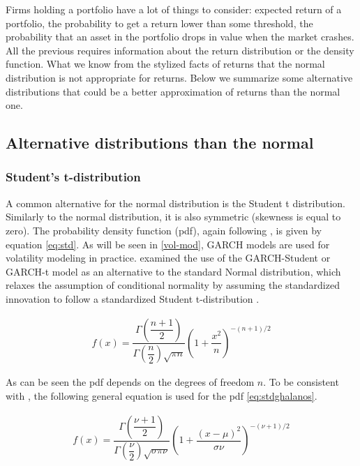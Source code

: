 \documentclass[a4paper, twoside]{templates/ociamthesis}
\begin{document}
\noindent Firms holding a portfolio have a lot of things to consider: expected return of a portfolio, the probability to get a return lower than some threshold, the probability that an asset in the portfolio drops in value when the market crashes. All the previous requires information about the return distribution or the density function. What we know from the stylized facts of returns that the normal distribution is not appropriate for returns. Below we summarize some alternative distributions that could be a better approximation of returns than the normal one.

\hypertarget{conditional-distributions}{%
\subsection{Alternative distributions than the normal}\label{conditional-distributions}}

\hypertarget{students-t-distribution}{%
\subsubsection{Student's t-distribution}\label{students-t-distribution}}

\noindent A common alternative for the normal distribution is the Student t distribution. Similarly to the normal distribution, it is also symmetric (skewness is equal to zero). The probability density function (pdf), again following \textcite{annaert2021}, is given by equation \eqref{eq:std}. As will be seen in \ref{vol-mod}, GARCH models are used for volatility modeling in practice. \textcite{bollerslev1987} examined the use of the GARCH-Student or GARCH-t model as an alternative to the standard Normal distribution, which relaxes the assumption of conditional normality by assuming the standardized innovation to follow a standardized Student t-distribution \autocite{bollerslev2008}.

\begin{align}
f(x) = \dfrac{\Gamma(\dfrac{n+1}{2})}{\Gamma(\dfrac{n}{2})\sqrt{\pi n}} (1+\dfrac{x^2}{n})^{-(n+1)/2}
 \label{eq:std}
\end{align}

\noindent As can be seen the pdf depends on the degrees of freedom \(n\). To be consistent with \textcite{ghalanos2020}, the following general equation is used for the pdf \eqref{eq:stdghalanos}.

\begin{align}
f(x) = \dfrac{\Gamma(\dfrac{\nu+1}{2})}{\Gamma(\dfrac{\nu}{2})\sqrt{\sigma \pi \nu}} \left(1+\dfrac{(x-\mu)^2}{\sigma \nu}\right)^{-(\nu+1)/2}
 \label{eq:stdghalanos}
\end{align}
\end{document}
